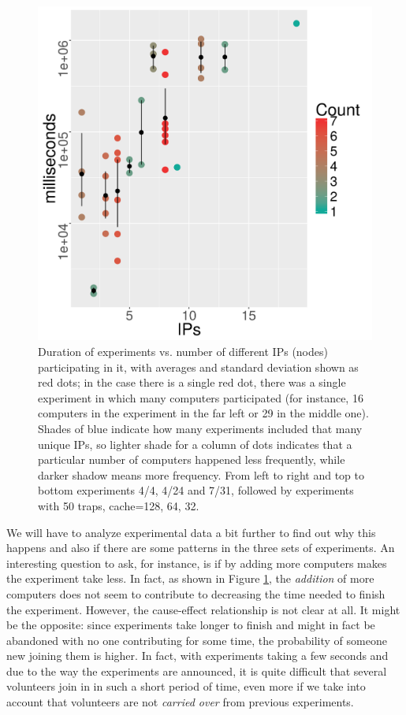 \documentclass[letterpaper]{article}
\begin{document}
\begin{figure}[!htb]
\includegraphics[width=0.32\linewidth]{time-vs-ips-alife-32.png}
\caption{Duration of experiments vs. number of different IPs (nodes)
  participating in it, with averages and standard deviation shown as
  red dots; in the case there is a single red dot, there was a single
  experiment in which many computers participated (for instance, 16
  computers in the experiment in the far left or 29 in the middle
  one). 
Shades of blue indicate how many experiments included that many unique IPs,
so lighter shade for a column of dots indicates that a particular number
of computers happened less frequently, while darker shadow means more frequency. 
From left to right and top to bottom experiments 4/4, 4/24 and 7/31,
followed by experiments with 50 traps, cache=128, 64, 32.}
\label{fig:duration}
\end{figure}
%
We will have to analyze experimental data a bit further to find out why
this happens and also if there are some patterns in the three sets of
experiments. An interesting question to ask, for instance, is if
by adding more computers makes the experiment take less. In fact, as
shown in Figure \ref{fig:duration}, the {\em addition} of more computers does
not seem to contribute to decreasing the time needed to finish the
experiment. However, the cause-effect relationship is not clear at
all. It might be the opposite: since experiments take longer to finish
and might in fact be abandoned with no one contributing for some time,
the probability of someone new joining them is higher. In fact,
with experiments taking a few seconds and due to the way the
experiments are announced, it is quite difficult that several
volunteers join in in such a short period of time, even more if we take
into account that volunteers are not {\em carried over} from previous
experiments. 
%
\end{document}
